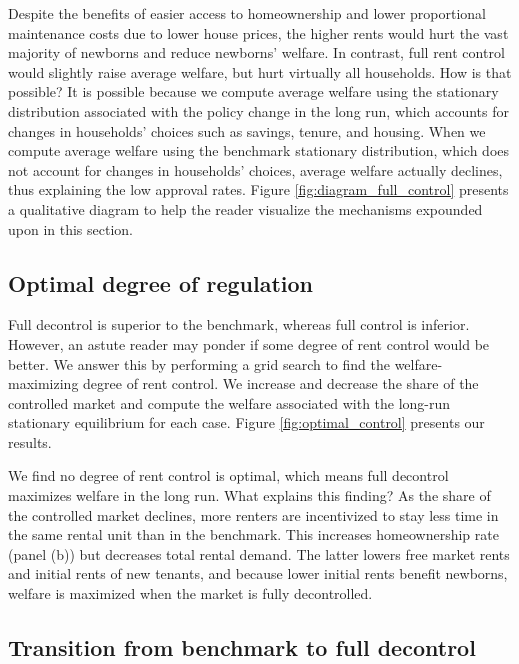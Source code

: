 \documentclass[parskip=full]{article}
\begin{document}
Despite the benefits of easier access to homeownership and lower proportional maintenance costs due to lower house prices, the higher rents would hurt the vast majority of newborns and reduce newborns' welfare. In contrast, full rent control would slightly raise average welfare, but hurt virtually all households. How is that possible? It is possible because we compute average welfare using the stationary distribution associated with the policy change in the long run, which accounts for changes in households' choices such as savings, tenure, and housing. When we compute average welfare using the benchmark stationary distribution, which does not account for changes in households' choices, average welfare actually declines, thus explaining the low approval rates. Figure \ref{fig:diagram_full_control} presents a qualitative diagram to help the reader visualize the mechanisms expounded upon in this section. 

\subsection{Optimal degree of regulation}\label{subsection:optimal_control}

Full decontrol is superior to the benchmark, whereas full control is inferior. However, an astute reader may ponder if some degree of rent control would be better. We answer this by performing a grid search to find the welfare-maximizing degree of rent control. We increase and decrease the share of the controlled market and compute the welfare associated with the long-run stationary equilibrium for each case. Figure \ref{fig:optimal_control} presents our results.

We find no degree of rent control is optimal, which means full decontrol maximizes welfare in the long run. What explains this finding? As the share of the controlled market declines, more renters are incentivized to stay less time in the same rental unit than in the benchmark. This increases homeownership rate (panel (b)) but decreases total rental demand. The latter lowers free market rents and initial rents of new tenants, and because lower initial rents benefit newborns, welfare is maximized when the market is fully decontrolled.

\subsection{Transition from benchmark to full decontrol}\label{subsection:transition}
\end{document}
